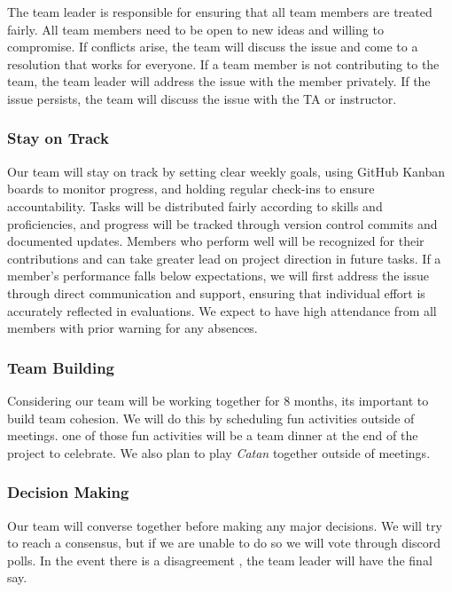 \documentclass{article}
\begin{document}

\raggedright
The team leader is responsible for ensuring that all team members are treated fairly.
All team members need to be open to new ideas and willing to compromise. If conflicts
arise, the team will discuss the issue and come to a resolution that works for everyone.
If a team member is not contributing to the team, the team leader will address the issue
with the member privately. If the issue persists, the team will discuss the issue with
the TA or instructor.

\subsubsection*{Stay on Track}

Our team will stay on track by setting clear weekly goals, 
using GitHub Kanban boards to monitor progress, and
holding regular check-ins to ensure accountability. Tasks 
will be distributed fairly according to skills and proficiencies, 
and progress will be tracked through version control commits and 
documented updates. Members who perform well will be recognized 
for their contributions and can take greater lead on project
direction in future tasks. If a member's performance 
falls below expectations, we will first address the issue 
through direct communication and support, ensuring that 
individual effort is accurately reflected in evaluations.
We expect to have high attendance from all members with prior 
warning for any absences.

\subsubsection*{Team Building}


\raggedright
Considering our team will be working together for 8 months, its important to build
team cohesion. We will do this by scheduling fun activities outside of meetings. one
of those fun activities will be a team dinner at the end of the project to celebrate.
We also plan to play \textit{Catan} together outside of meetings. 

\subsubsection*{Decision Making} 


\raggedright
Our team will converse together before making any major decisions. We will try to reach
a consensus, but if we are unable to do so we will vote through discord polls. In the event
there is a disagreement , the team leader will have the final say.
\end{document}
